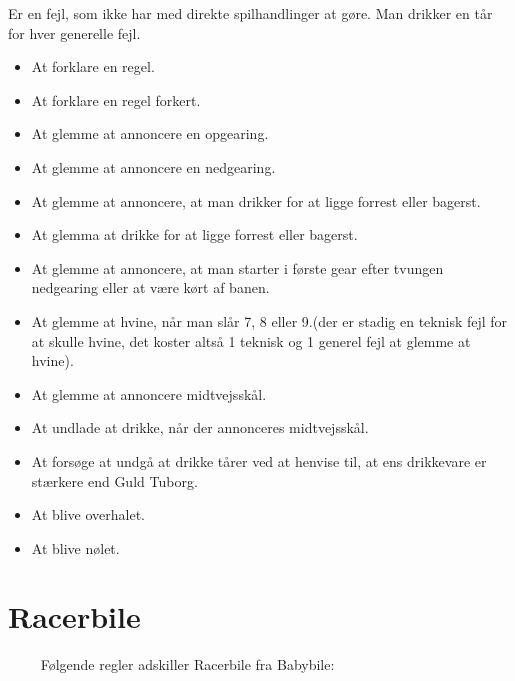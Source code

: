 \documentclass[12pt]{article}
\begin{document}
Er en fejl, som ikke har med direkte spilhandlinger at gøre. Man drikker en tår for hver generelle fejl.

\begin{itemize}
	\item At forklare en regel.
	\item At forklare en regel forkert.
	\item At glemme at annoncere en opgearing.
	\item At glemme at annoncere en nedgearing.
	\item At glemme at annoncere, at man drikker for at ligge forrest eller bagerst.
	\item At glemma at drikke for at ligge forrest eller bagerst.
	\item At glemme at annoncere, at man starter i første gear efter tvungen nedgearing eller at være kørt af banen.
	\item At glemme at hvine, når man slår 7, 8 eller 9.(der er stadig en teknisk fejl for at skulle hvine, det koster altså 1 teknisk og 1 generel fejl at glemme at hvine).
	\item At glemme at annoncere midtvejsskål.
	\item At undlade at drikke, når der annonceres midtvejsskål.
	\item At forsøge at undgå at drikke tårer ved at henvise til, at ens drikkevare er stærkere end Guld Tuborg.
	\item At blive overhalet.
	\item At blive nølet.
\end{itemize}

\newpage

\section*{Racerbile}

$\qquad$  Følgende regler adskiller Racerbile fra Babybile:
\end{document}
